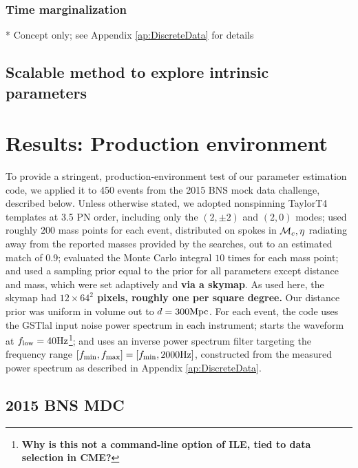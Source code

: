 \documentclass[twocolumn,prd,nofootinbib]{revtex4}
\newcommand\unit[1]{{\rm #1}}
\newcommand\mc{{{\cal M}_c}}
\newcommand\nEventsMDC{450}
\newcommand\gstlal{{\sc GSTlal}}
\begin{document}


\subsubsection{Time marginalization}

* Concept only; see Appendix \ref{ap:DiscreteData} for details



\subsection{Scalable method to explore intrinsic parameters }



\section{Results: Production environment}
\label{sec:Results}

To provide a stringent, production-environment test of our parameter estimation code, we applied it to \nEventsMDC{}
events from the 2015 BNS mock data challenge, described below.  
%
Unless otherwise stated, we adopted nonspinning TaylorT4 templates at 3.5 PN order, including only the $(2,\pm 2)$ and
$(2,0)$ modes;  used roughly $200$ mass points for each event, distributed on spokes in $\mc,\eta$ radiating away from the reported
masses  provided by the searches, out to an estimated match of 0.9; 
 evaluated the Monte Carlo integral $10$ times for each mass point; and used a sampling prior equal to the prior for all
 parameters except distance and mass, which were set adaptively and \textbf{via a skymap}.    As used here, the skymap had
 \textbf{$12\times 64^2$ pixels, roughly one per square degree.}  Our distance prior was
 uniform in volume out to $d=300\unit{Mpc}$.  
For each event, the code uses the \gstlal{} input noise power spectrum in each instrument; starts the waveform at $f_{\rm
  low}=40\unit{Hz}$\footnote{ \textbf{Why is this not a command-line option of ILE, tied to data selection in CME?}};
and uses an inverse power spectrum filter targeting the frequency range $[f_{\rm min},f_{\rm max}]=[f_{\rm min},
  2000\unit{Hz}]$, constructed from the measured power spectrum as described in Appendix \ref{ap:DiscreteData}.  

\subsection{2015 BNS MDC}
\end{document}
